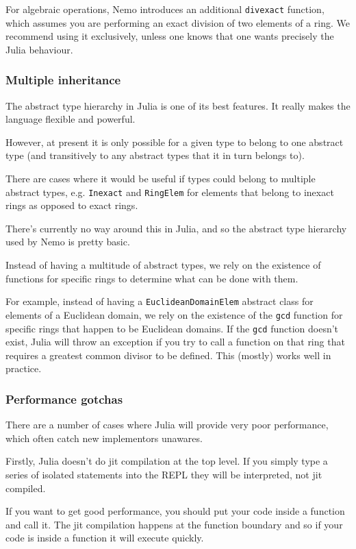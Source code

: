 \documentclass[a4paper,10pt]{article}
\newcommand{\code}{\lstinline}
\begin{document}
For algebraic operations, Nemo introduces an additional \code{divexact} function, which assumes you are
performing an exact division of two elements of a ring. We recommend using it exclusively, unless one
knows that one wants precisely the Julia behaviour.

\subsubsection{Multiple inheritance}

The abstract type hierarchy in Julia is one of its best features. It really makes the language
flexible and powerful.

However, at present it is only possible for a given type to belong to one abstract type (and
transitively to any abstract types that it in turn belongs to).

There are cases where it would be useful if types could belong to multiple abstract types, e.g.
\code{Inexact} and \code{RingElem} for elements that belong to inexact rings as opposed to exact 
rings.

There's currently no way around this in Julia, and so the abstract type hierarchy used by Nemo is
pretty basic.

Instead of having a multitude of abstract types, we rely on the existence of functions for specific
rings to determine what can be done with them.

For example, instead of having a \code{EuclideanDomainElem} abstract class for elements of a Euclidean
domain, we rely on the existence of the \code{gcd} function for specific rings that happen to be
Euclidean domains. If the \code{gcd} function doesn't exist, Julia will throw an exception if you
try to call a function on that ring that requires a greatest common divisor to be defined. This 
(mostly) works well in practice.

\subsubsection{Performance gotchas}

There are a number of cases where Julia will provide very poor performance, which often catch new
implementors unawares.

Firstly, Julia doesn't do jit compilation at the top level. If you simply type a series of isolated
statements into the REPL they will be interpreted, not jit compiled.

If you want to get good performance, you should put your code inside a function and call it. The jit
compilation happens at the function boundary and so if your code is inside a function it will
execute quickly.
\end{document}
